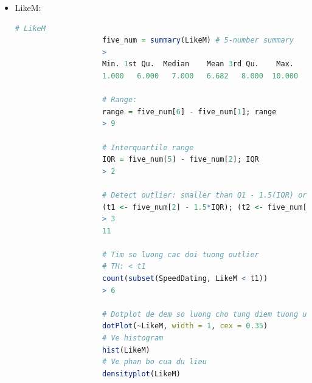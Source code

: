 \documentclass[a4paper,12pt]{article}
\begin{document}
\begin{enumerate}[label = {\alph*)}]
\begin{itemize}
					
				\item LikeM:
					\begin{lstlisting}[language = R]
					# LikeM
					five_num = summary(LikeM) # 5-number summary
					> 
					Min. 1st Qu.  Median    Mean 3rd Qu.    Max.    NA 
					1.000   6.000   7.000   6.682   8.000  10.000       2
					
					# Range:
					range = five_num[6] - five_num[1]; range
					> 9
					
					# Interquartile range
					IQR = five_num[5] - five_num[2]; IQR
					> 2
					
					# Detect outlier: smaller than Q1 - 1.5(IQR) or greater than Q3 + 1.5(IQR)
					(t1 <- five_num[2] - 1.5*IQR); (t2 <- five_num[5] + 1.5*IQR)
					> 3
					11
					
					# Tim so luong cac doi tuong outlier
					# TH: < t1
					count(subset(SpeedDating, LikeM < t1))
					> 6
					
					# Dotplot de dem so luong cho tung diem tuong ung
					dotPlot(~LikeM, width = 1, cex = 0.35)
					# Ve histogram
					hist(LikeM)
					# Ve phan bo cua du lieu
					densityplot(LikeM)
					\end{lstlisting}
					

\end{itemize}
\end{enumerate}
\end{document}
